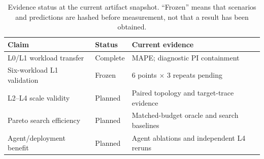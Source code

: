 \begin{table}[t]
\centering
\caption{Evidence status at the current artifact snapshot.  ``Frozen'' means
that scenarios and predictions are hashed before measurement, not that a result
has been obtained.}
\label{tab:results-template}
\scriptsize
\setlength{\tabcolsep}{3.5pt}
\begin{tabular}{p{}p{}p{}}
\toprule
Claim & Status & Current evidence \\
\midrule
L0/L1 workload transfer & Complete & \PilotMeanMAPE{} MAPE; \PilotCoverage{} diagnostic PI containment \\
Six-workload L1 validation & Frozen & 6 points $\times$ 3 repeats pending \\
L2--L4 scale validity & Planned & Paired topology and target-trace evidence \\
Pareto search efficiency & Planned & Matched-budget oracle and search baselines \\
Agent/deployment benefit & Planned & Agent ablations and independent L4 reruns \\
\bottomrule
\end{tabular}
\end{table}
